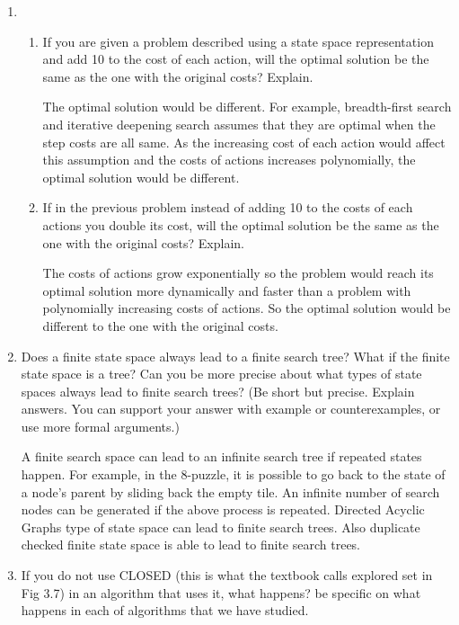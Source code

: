 \documentclass[12pt]{article}
\begin{document}
\begin{enumerate}
\begin{enumerate}
  \end{enumerate}

\item
  \begin{enumerate}
  \item If you are given a problem described using a state space representation and add 10 to the cost of each action, will the optimal solution be the same as the one with the original costs? Explain.

  The optimal solution would be different. For example, breadth-first search and iterative deepening search assumes that they are optimal when the step costs are all same. As the increasing cost of each action would affect this assumption and the costs of actions increases polynomially, the optimal solution would be different.

  \item If in the previous problem instead of adding 10 to the costs of each actions you double its cost, will the optimal solution be the same as the one with the original costs? Explain.
  
  The costs of actions grow exponentially so the problem would reach its optimal solution more dynamically and faster than a problem with polynomially increasing costs of actions. So the optimal solution would be different to the one with the original costs.
  
  \end{enumerate}

\item Does a finite state space always lead to a finite search tree? What if the finite state space is a tree? Can you be more precise about what types of state spaces always lead to finite search trees? (Be short but precise. Explain answers. You can support your answer with example or counterexamples, or use more formal arguments.)

  A finite search space can lead to an infinite search tree if repeated states happen. For example, in the 8-puzzle, it is possible to go back to the state of a node's parent by sliding back the empty tile. An infinite number of search nodes can be generated if the above process is repeated. Directed Acyclic Graphs type of state space can lead to finite search trees. Also duplicate checked finite state space is able to lead to finite search trees. 
  
\item If you do not use CLOSED (this is what the textbook calls explored set in Fig 3.7) in an algorithm that uses it, what happens? be specific on what happens in each of algorithms that we have studied.


\end{enumerate}
\end{document}

